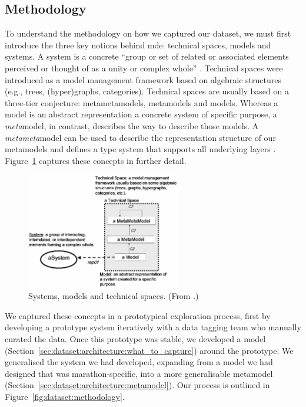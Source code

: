 \subsection{Methodology}
\label{sec:dataset:architecture:methodology}

To understand the methodology on how we captured our dataset, we must first introduce the three key notions behind \gls{mde}: technical spaces, models and systems. A system is a concrete ``group or set of related or associated elements perceived or thought of as a unity or complex whole'' \citep{oed:system}. Technical spaces were introduced \citet{Bezivin:2002} as a model management framework based on algebraic structures (e.g., trees, (hyper)graphs, categories). Technical spaces are usually based on a three-tier conjecture: metametamodels, metamodels and models. Whereas a model is an abstract representation a concrete system of specific purpose, a \textit{meta}model, in contrast, describes the way to describe those models. A \textit{metameta}model can be used to describe the representation structure of our metamodels and defines a type system that supports all underlying layers \citep{Bezivin:2006gw}. Figure~\ref{fig:dataset:bezivin2006_metamodel} captures these concepts in further detail.

\begin{figure}[h]
  \centering
  \includegraphics[width=0.6\textwidth]{images/dataset/bezivin2006_metamodel}
  \caption[An overview of systems, models and technical spaces]{Systems, models and technical spaces. (From \citep{Bezivin:2006gw}.)}
  \label{fig:dataset:bezivin2006_metamodel}
\end{figure}

We captured these concepts in a prototypical exploration process, first by developing a prototype system iteratively with a data tagging team who manually curated the data. Once this prototype was stable, we developed a model (Section~\ref{sec:dataset:architecture:what_to_capture}) around the prototype. We generalised the system we had developed, expanding from a model we had designed that was marathon-specific, into a more generalisable metamodel (Section~\ref{sec:dataset:architecture:metamodel}). Our process is outlined in Figure~\ref{fig:dataset:methodology}.

